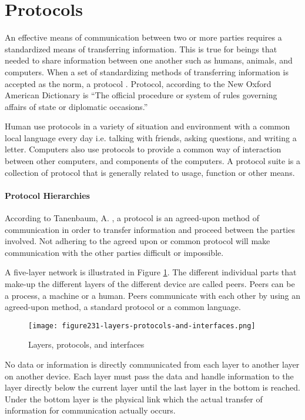 \section{Protocols}
An effective means of communication between two or more parties requires a standardized means of transferring information. This is true for beings that needed to share information between one another such as humans, animals, and computers. When a set of standardizing methods of transferring information is accepted as the norm, a protocol \cite{FallBook}.  Protocol, according to the New Oxford American Dictionary is ``The official procedure or system of rules governing affairs of state or diplomatic occasions.''

Human use protocols in a variety of situation and environment with a common local language every day i.e. talking with friends, asking questions, and writing a letter. Computers also use protocols to provide a common way of interaction between other computers, and components of the computers. A protocol suite is a collection of protocol that is generally related to usage, function or other means.

\paragraph{Protocol Hierarchies}
According to Tanenbaum, A. \cite{TanenbaumBook}, a protocol is an agreed-upon method of communication in order to transfer information and proceed between the parties involved. Not adhering to the agreed upon or common protocol will make communication with the other parties difficult or impossible.

A five-layer network is illustrated in Figure \ref{fig:fig231}. The different individual parts that make-up the different layers of the different device are called peers. Peers can be a process, a machine or a human. Peers communicate with each other by using an agreed-upon method, a standard protocol or a common language.

\begin{figure}[h]
\centering
\texttt{[image: figure231-layers-protocols-and-interfaces.png]}
\caption{Layers, protocols, and interfaces \protect\cite{TanenbaumBook}}
\label{fig:fig231}
\end{figure}

No data or information is directly communicated from each layer to another layer on another device. Each layer must pass the data and handle information to the layer directly below the current layer until the last layer in the bottom is reached. Under the bottom layer is the physical link which the actual transfer of information for communication actually occurs.


